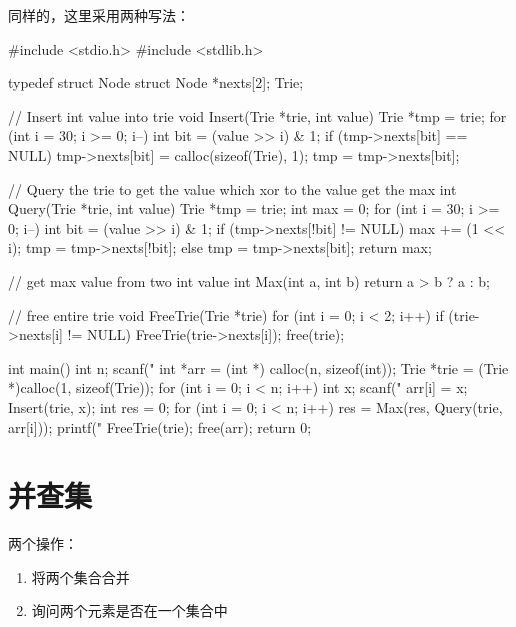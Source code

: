 同样的，这里采用两种写法：

\begin{mycpptwocol}[链表形式的Trie]
    #include <stdio.h>
    #include <stdlib.h>

    typedef struct Node {
        struct Node *nexts[2];
    } Trie;

    // Insert int value into trie
    void Insert(Trie *trie, int value) {
        Trie *tmp = trie;
        for (int i = 30; i >= 0; i--) {
            int bit = (value >> i) & 1;
            if (tmp->nexts[bit] == NULL) {
                tmp->nexts[bit] = calloc(sizeof(Trie), 1);
            }
            tmp = tmp->nexts[bit];
        }
    }

    // Query the trie to get the value which xor to the value get the max
    int Query(Trie *trie, int value) {
        Trie *tmp = trie;
        int max = 0;
        for (int i = 30; i >= 0; i--) {
            int bit = (value >> i) & 1;
            if (tmp->nexts[!bit] != NULL) {
                max += (1 << i);
                tmp = tmp->nexts[!bit];
            } else {
                tmp = tmp->nexts[bit];
            }
        }
        return max;
    }

    // get max value from two int value
    int Max(int a, int b) {
        return a > b ? a : b;
    }

    // free entire trie
    void FreeTrie(Trie *trie) {
        for (int i = 0; i < 2; i++) {
            if (trie->nexts[i] != NULL) {
                FreeTrie(trie->nexts[i]);
            }
        }
        free(trie);
    }

    int main() {
        int n;
        scanf("%
        int *arr = (int *) calloc(n, sizeof(int));
        Trie *trie = (Trie *)calloc(1, sizeof(Trie));
        for (int i = 0; i < n; i++) {
            int x;
            scanf("%
            arr[i] = x;
            Insert(trie, x);
        }
        int res = 0;
        for (int i = 0; i < n; i++) {
            res = Max(res, Query(trie, arr[i]));
        }
        printf("%
        FreeTrie(trie);
        free(arr);
        return 0;
    }
\end{mycpptwocol}


\section{并查集}

两个操作：

\begin{enumerate}
    \item 将两个集合合并
    \item 询问两个元素是否在一个集合中
\end{enumerate}

